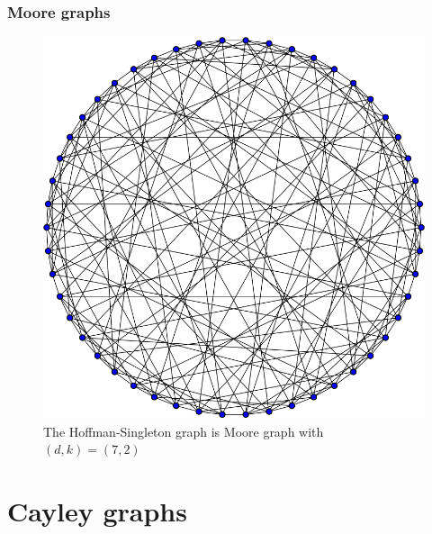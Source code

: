 \documentclass{beamer}
\begin{document}
\begin{frame}
	\frametitle{Moore graphs}
	\begin{figure}[!ht]
 		\centering
 		\includegraphics[scale=0.25]{Hoffman-Singleton_graph.png}
		\caption{The Hoffman-Singleton graph is Moore graph with $(d,k)=(7,2)$}
	\end{figure}
\end{frame}
\section{Cayley graphs} 
\end{document}
